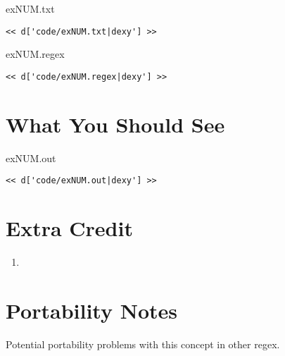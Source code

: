 
\begin{code}{exNUM.txt}
\begin{Verbatim}
<< d['code/exNUM.txt|dexy'] >>
\end{Verbatim}
\end{code}


\begin{code}{exNUM.regex}
\begin{Verbatim}
<< d['code/exNUM.regex|dexy'] >>
\end{Verbatim}
\end{code}


\section{What You Should See}


\begin{code}{exNUM.out}
\begin{Verbatim}
<< d['code/exNUM.out|dexy'] >>
\end{Verbatim}
\end{code}


\section{Extra Credit}

\begin{enumerate}
\item 
\end{enumerate}

\section{Portability Notes}

Potential portability problems with this concept in other regex.
